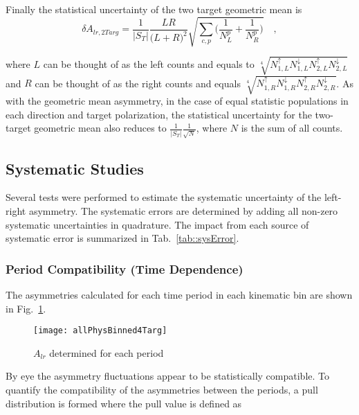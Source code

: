 Finally the statistical uncertainty of the two target geometric mean is
\begin{equation}
  \delta A_{lr,2Targ} = \frac{1}{|S_T|}
  \frac{LR}{\Big( L+R \Big)^2}
  \sqrt{
    \sum_{c,p}
    \Big(
    \frac{1}{N_L^{p}}
    + \frac{1}{N_R^p}
    \Big)
  } \quad,
\end{equation}

\noindent
where $L$ can be thought of as the left counts and equals to
$\sqrt[4]{N_{1,L}^\uparrow N_{1,L}^\downarrow N_{2,L}^\uparrow
  N_{2,L}^\downarrow}$ and $R$ can be thought of as the right counts and equals
$\sqrt[4]{N_{1,R}^\uparrow N_{1,R}^\downarrow N_{2,R}^\uparrow
  N_{2,R}^\downarrow}$.  As with the geometric mean asymmetry, in the case of
equal statistic populations in each direction and target polarization, the
statistical uncertainty for the two-target geometric mean also reduces to
$\frac{1}{|S_T|}\frac{1}{\sqrt{N}}$, where $N$ is the sum of all counts.


\subsection{Systematic Studies} \label{sec::systematics}
Several tests were performed to estimate the systematic uncertainty of the
left-right asymmetry.  The systematic errors are determined by adding all
non-zero systematic uncertainties in quadrature.  The impact from each source of
systematic error is summarized in Tab.~\ref{tab::sysError}.

\subsubsection{Period Compatibility (Time Dependence)}
The asymmetries calculated for each time period in each kinematic bin are shown
in Fig.~\ref{fig::allPhysBinned4Targ}.

\begin{figure}[h!t]
  \begin{center}
    \texttt{[image: allPhysBinned4Targ]}
    \caption{$A_{lr}$ determined for each period}
    \label{fig::allPhysBinned4Targ}
  \end{center}
\end{figure}

\noindent
By eye the asymmetry fluctuations appear to be statistically compatible.  To
quantify the compatibility of the asymmetries between the periods, a pull
distribution is formed where the pull value is defined as

